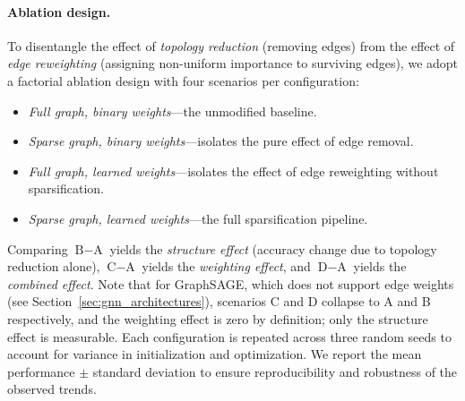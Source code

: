 \documentclass[conference]{IEEEtran}
\begin{document}
\paragraph{Ablation design.} To disentangle the effect of \emph{topology reduction} (removing edges) from the effect of \emph{edge reweighting} (assigning non-uniform importance to surviving edges), we adopt a factorial ablation design with four scenarios per configuration:
\begin{itemize}
    \item[\textbf{A.}] \emph{Full graph, binary weights}---the unmodified baseline.
    \item[\textbf{B.}] \emph{Sparse graph, binary weights}---isolates the pure effect of edge removal.
    \item[\textbf{C.}] \emph{Full graph, learned weights}---isolates the effect of edge reweighting without sparsification.
    \item[\textbf{D.}] \emph{Sparse graph, learned weights}---the full sparsification pipeline.
\end{itemize}
Comparing $\text{B} - \text{A}$ yields the \emph{structure effect} (accuracy change due to topology reduction alone), $\text{C} - \text{A}$ yields the \emph{weighting effect}, and $\text{D} - \text{A}$ yields the \emph{combined effect}. Note that for GraphSAGE, which does not support edge weights (see Section~\ref{sec:gnn_architectures}), scenarios C and D collapse to A and B respectively, and the weighting effect is zero by definition; only the structure effect is measurable. Each configuration is repeated across three random seeds to account for variance in initialization and optimization. We report the mean performance $\pm$ standard deviation to ensure reproducibility and robustness of the observed trends.
\end{document}
